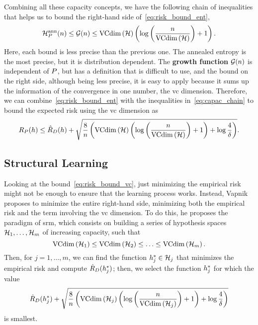 %
Combining all these capacity concepts, we have the following chain of inequalities that helps us to bound the right-hand side of~\eqref{eq:risk_bound_ent},
\begin{equation}
    \label{eq:capac_chain}
    \mathcal{H}^{\text{ann}}_{\distf}(\nsamples) \leq \mathcal{G}(\nsamples) \leq \vcdim{\hypspace} \left(\log\left(\frac{\nsamples}{\vcdim{\hypspace}}\right) + 1 \right).
\end{equation}
Here, each bound is less precise than the previous one. The annealed entropy is the most precise, but it is distribution dependent. The \textbf{growth function} $\mathcal{G}(n)$ is independent of $P$, but has a definition that is difficult to use, and the bound on the right side, although being less precise, it is easy to apply because it sums up the information of the convergence in one number, the \acrshort{vc} dimension.
%
Therefore, we can combine~\eqref{eq:risk_bound_ent} with the inequalities in~\eqref{eq:capac_chain} to bound the expected risk using the \acrshort{vc} dimension as
\begin{equation}
    \label{eq:risk_bound_vc}
    \exprisk(\hypf) \leq \emprisk(\hypf) + \sqrt{\frac{8}{\nsamples} \left(\vcdim{\hypspace} \left(\log\left(\frac{\nsamples}{\vcdim{\hypspace}}\right) + 1 \right) + \log \frac{4}{\delta} \right)} .
\end{equation}

\subsection{Structural Learning}
Looking at the bound~\ref{eq:risk_bound_vc}, just minimizing the empirical risk might not be enough to ensure that the learning process works. Instead, Vapnik proposes to minimize the entire right-hand side, minimizing both the empirical risk and the term involving the \acrshort{vc} dimension.
To do this, he proposes the paradigm of \acrfull{srm}, which consists on building a series of hypothesis spaces $\mathcal{H}_1, \ldots, \mathcal{H}_m$ of increasing capacity, such that 
\begin{equation}
    \nonumber
    \operatorname{VCdim}\left(\mathcal{H}_1\right) \leq \operatorname{VCdim}\left(\mathcal{H}_2\right) \leq \ldots \leq \operatorname{VCdim}\left(\mathcal{H}_m\right) .
\end{equation}
Then, for $j=1, \ldots, m$, we can find the function ${h}^*_j \in \mathcal{H}_j$ that minimizes the empirical risk and compute $\hat{R}_{D}({h}^*_j)$; then, we select the function $ {h}^*_j$ for which the value
\begin{equation}
    \hat{R}_{D}({h}^*_j) + \sqrt{\frac{8}{n} \left(\operatorname{VCdim}\left(\mathcal{H}_j\right) \left(\log\left(\frac{n}{\operatorname{VCdim}\left(\mathcal{H}_j\right)}\right) + 1 \right) + \log \frac{4}{\delta} \right)}
\end{equation}
is smallest.

